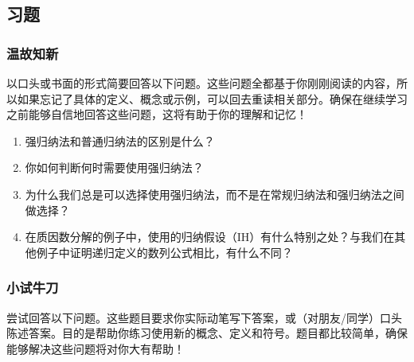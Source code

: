 \subsection{习题}

\subsubsection*{温故知新}

以口头或书面的形式简要回答以下问题。这些问题全都基于你刚刚阅读的内容，所以如果忘记了具体的定义、概念或示例，可以回去重读相关部分。确保在继续学习之前能够自信地回答这些问题，这将有助于你的理解和记忆！

\begin{enumerate}[label=(\arabic*)]
    \item 强归纳法和普通归纳法的区别是什么？
    \item 你如何判断何时需要使用强归纳法？
    \item 为什么我们总是可以选择使用强归纳法，而不是在常规归纳法和强归纳法之间做选择？
    \item 在质因数分解的例子中，使用的归纳假设（IH）有什么特别之处？与我们在其他例子中证明递归定义的数列公式相比，有什么不同？
\end{enumerate}

\subsubsection*{小试牛刀}

尝试回答以下问题。这些题目要求你实际动笔写下答案，或（对朋友/同学）口头陈述答案。目的是帮助你练习使用新的概念、定义和符号。题目都比较简单，确保能够解决这些问题将对你大有帮助！

